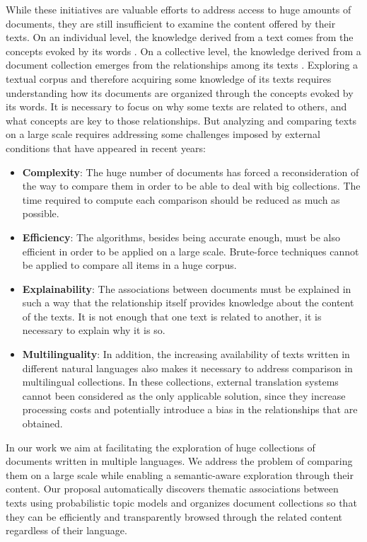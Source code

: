 While these initiatives are valuable efforts to address access to huge amounts of documents, they are still insufficient to examine the content offered by their texts. On an individual level, the knowledge derived from a text comes from the concepts evoked by its words \citep{Griffiths2007}. On a collective level, the knowledge derived from a document collection emerges from the relationships among its texts \citep{Kenter2015}. Exploring a textual corpus and therefore acquiring some knowledge of its texts requires understanding how its documents are organized through the concepts evoked by its words. It is necessary to focus on why some texts are related to others, and what concepts are key to those relationships. But analyzing and comparing texts on a large scale requires addressing some challenges imposed by external conditions that have appeared in recent years:
\begin{itemize}
\item \textbf{Complexity}: The huge number of documents has forced a reconsideration of the way to compare them in order to be able to deal with big collections. The time required to compute each comparison should be reduced as much as possible.
\item \textbf{Efficiency}: The algorithms, besides being accurate enough, must be also efficient in order to be applied on a large scale. Brute-force techniques cannot be applied to compare all items in a huge corpus.
\item \textbf{Explainability}: The associations between documents must be explained in such a way that the relationship itself provides knowledge about the content of the texts. It is not enough that one text is related to another, it is necessary to explain why it is so. 
\item \textbf{Multilinguality}: In addition, the increasing availability of texts written in different natural languages also makes it necessary to address comparison in multilingual collections. In these collections, external translation systems cannot been considered as the only applicable solution, since they increase processing costs and potentially introduce a bias in the relationships that are obtained. 
\end{itemize}

In our work we aim at facilitating the exploration of huge collections of documents written in multiple languages. We address the problem of comparing them on a large scale while enabling a semantic-aware exploration through their content. Our proposal automatically discovers thematic associations between texts using probabilistic topic models and organizes document collections so that they can be efficiently and transparently browsed through the related content regardless of their language.

